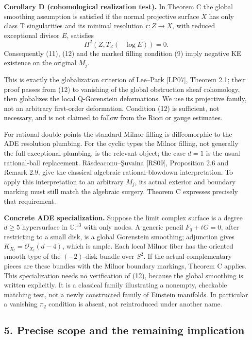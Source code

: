 \documentclass[
  11pt,
]{article}
\begin{document}
\textbf{Corollary D (cohomological realization test).} In Theorem C the
global smoothing assumption is satisfied if the normal projective
surface \(X\) has only class T singularities and its minimal resolution
\(r:Z\to X\), with reduced exceptional divisor \(E\), satisfies \[
                         H^2(Z,T_Z(-\log E))=0.        \tag{12}
\] Consequently (11), (12) and the marked filling condition (9) imply
negative KE existence on the original \(M_j\).

This is exactly the globalization criterion of Lee--Park {[}LP07{]},
Theorem 2.1; their proof passes from (12) to vanishing of the global
obstruction sheaf cohomology, then globalizes the local Q-Gorenstein
deformations. We use its projective family, not an arbitrary first-order
deformation. Condition (12) is sufficient, not necessary, and is not
claimed to follow from the Ricci or gauge estimates.

For rational double points the standard Milnor filling is diffeomorphic
to the ADE resolution plumbing. For the cyclic types the Milnor filling,
not generally the full exceptional plumbing, is the relevant object; the
case \(d=1\) is the usual rational-ball replacement. Răsdeaconu--Şuvaina
{[}RS09{]}, Proposition 2.6 and Remark 2.9, give the classical algebraic
rational-blowdown interpretation. To apply this interpretation to an
arbitrary \(M_j\), its actual exterior and boundary marking must still
match the algebraic surgery. Theorem C expresses precisely that
requirement.

\textbf{Concrete ADE specialization.} Suppose the limit complex surface
is a degree \(d\ge5\) hypersurface in \(\mathbb{CP}^3\) with only nodes.
A generic pencil \(F_0+tG=0\), after restricting to a small disk, is a
global Gorenstein smoothing; adjunction gives
\(K_{X_t}=\mathcal O_{X_t}(d-4)\), which is ample. Each local Milnor
fiber has the oriented smooth type of the \((-2)\)-disk bundle over
\(S^2\). If the actual complementary pieces are these bundles with the
Milnor boundary markings, Theorem C applies. This specialization needs
no verification of (12), because the global smoothing is written
explicitly. It is a classical family illustrating a nonempty, checkable
matching test, not a newly constructed family of Einstein manifolds. In
particular a vanishing \(\pi_2\) condition is absent, not reintroduced
under another name.

\hypertarget{precise-scope-and-the-remaining-implication}{%
\subsection{5. Precise scope and the remaining
implication}\label{precise-scope-and-the-remaining-implication}}
\end{document}
